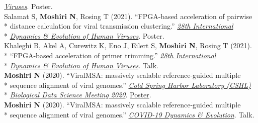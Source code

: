 \documentclass[margin,line]{res}
\begin{document}
\begin{resume}
\hspace*{7.5mm} \href{https://cpd.ucsd.edu/hivdynamics/}{\textit{Viruses}}. Poster.\\
\hspace*{4mm} Salamat S, \textbf{Moshiri N}, Rosing T (2021). ``FPGA-based acceleration of pairwise\\*
\hspace*{9mm} distance calculation for viral transmission clustering.'' \href{https://cpd.ucsd.edu/hivdynamics/}{\textit{28th International}}\\*\vspace{2mm}
\hspace*{8mm} \href{https://cpd.ucsd.edu/hivdynamics/}{\textit{Dynamics \& Evolution of Human Viruses}}. Poster.\\
\hspace*{4mm} Khaleghi B, Akel A, Curewitz K, Eno J, Eilert S, \textbf{Moshiri N}, Rosing T (2021).\\*
\hspace*{9mm} ``FPGA-based acceleration of primer trimming.'' \href{https://cpd.ucsd.edu/hivdynamics/}{\textit{28th International}}\\*\vspace{2mm}
\hspace*{8mm} \href{https://cpd.ucsd.edu/hivdynamics/}{\textit{Dynamics \& Evolution of Human Viruses}}. Talk.\\
\hspace*{4mm} \textbf{Moshiri N} (2020). ``ViralMSA: massively scalable reference-guided multiple\\*
\hspace*{9mm} sequence alignment of viral genomes.'' \href{http://meetings.cshl.edu/meetings.aspx?meet=DATA&year=18}{\textit{Cold Spring Harbor Laboratory (CSHL)}}\\*\vspace{2mm}
\hspace*{8mm} \href{http://meetings.cshl.edu/meetings.aspx?meet=DATA&year=18}{\textit{Biological Data Science Meeting 2020}}. \href{https://meetings.cshl.edu/posters/data20/data2020_AbstractBookVirtual.pdf}{Poster}.\\
\hspace*{4mm} \textbf{Moshiri N} (2020). ``ViralMSA: massively scalable reference-guided multiple\\*\vspace{2mm}
\hspace*{8mm} sequence alignment of viral genomes.'' \href{https://cpd.ucsd.edu/covid19/}{\textit{COVID-19 Dynamics \& Evolution}}. Talk.\\

\end{resume}
\end{document}
